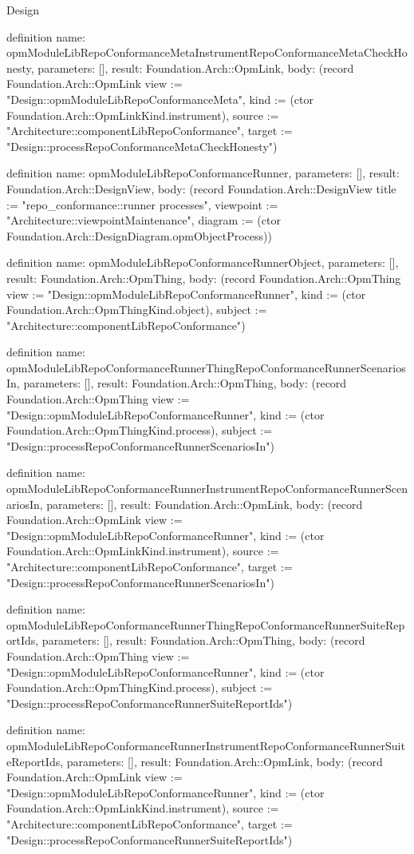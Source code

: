 \begin{lexlean}{Design}
\begin{semanticmodule}
definition{
  name: opmModuleLibRepoConformanceMetaInstrumentRepoConformanceMetaCheckHonesty,
  parameters: [],
  result: Foundation.Arch::OpmLink,
  body: (record Foundation.Arch::OpmLink {view := "Design::opmModuleLibRepoConformanceMeta", kind := (ctor Foundation.Arch::OpmLinkKind.instrument), source := "Architecture::componentLibRepoConformance", target := "Design::processRepoConformanceMetaCheckHonesty"})
}

definition{
  name: opmModuleLibRepoConformanceRunner,
  parameters: [],
  result: Foundation.Arch::DesignView,
  body: (record Foundation.Arch::DesignView {title := "repo_conformance::runner processes", viewpoint := "Architecture::viewpointMaintenance", diagram := (ctor Foundation.Arch::DesignDiagram.opmObjectProcess)})
}

definition{
  name: opmModuleLibRepoConformanceRunnerObject,
  parameters: [],
  result: Foundation.Arch::OpmThing,
  body: (record Foundation.Arch::OpmThing {view := "Design::opmModuleLibRepoConformanceRunner", kind := (ctor Foundation.Arch::OpmThingKind.object), subject := "Architecture::componentLibRepoConformance"})
}

definition{
  name: opmModuleLibRepoConformanceRunnerThingRepoConformanceRunnerScenariosIn,
  parameters: [],
  result: Foundation.Arch::OpmThing,
  body: (record Foundation.Arch::OpmThing {view := "Design::opmModuleLibRepoConformanceRunner", kind := (ctor Foundation.Arch::OpmThingKind.process), subject := "Design::processRepoConformanceRunnerScenariosIn"})
}

definition{
  name: opmModuleLibRepoConformanceRunnerInstrumentRepoConformanceRunnerScenariosIn,
  parameters: [],
  result: Foundation.Arch::OpmLink,
  body: (record Foundation.Arch::OpmLink {view := "Design::opmModuleLibRepoConformanceRunner", kind := (ctor Foundation.Arch::OpmLinkKind.instrument), source := "Architecture::componentLibRepoConformance", target := "Design::processRepoConformanceRunnerScenariosIn"})
}

definition{
  name: opmModuleLibRepoConformanceRunnerThingRepoConformanceRunnerSuiteReportIds,
  parameters: [],
  result: Foundation.Arch::OpmThing,
  body: (record Foundation.Arch::OpmThing {view := "Design::opmModuleLibRepoConformanceRunner", kind := (ctor Foundation.Arch::OpmThingKind.process), subject := "Design::processRepoConformanceRunnerSuiteReportIds"})
}

definition{
  name: opmModuleLibRepoConformanceRunnerInstrumentRepoConformanceRunnerSuiteReportIds,
  parameters: [],
  result: Foundation.Arch::OpmLink,
  body: (record Foundation.Arch::OpmLink {view := "Design::opmModuleLibRepoConformanceRunner", kind := (ctor Foundation.Arch::OpmLinkKind.instrument), source := "Architecture::componentLibRepoConformance", target := "Design::processRepoConformanceRunnerSuiteReportIds"})
}


\end{semanticmodule}
\end{lexlean}
